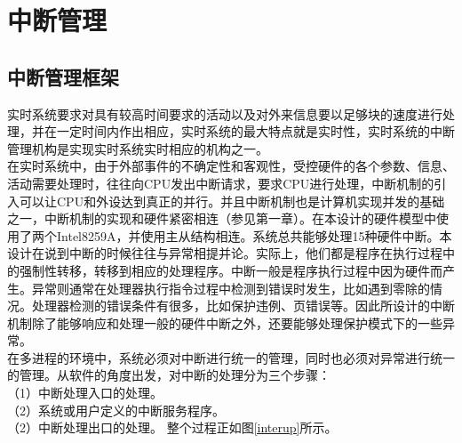 \documentclass[UTF8,nofonts,cs4size]{ctexrep}
\begin{document}
\section{中断管理}
\subsection{中断管理框架}
实时系统要求对具有较高时间要求的活动以及对外来信息要以足够块的速度进行处理，并在一定时间内作出相应，实时系统的最大特点就是实时性，实时系统的中断管理机构是实现实时系统实时相应的机构之一。
\\
\indent 在实时系统中，由于外部事件的不确定性和客观性，受控硬件的各个参数、信息、活动需要处理时，往往向CPU发出中断请求，要求CPU进行处理，中断机制的引入可以让CPU和外设达到真正的并行。并且中断机制也是计算机实现并发的基础之一，中断机制的实现和硬件紧密相连（参见第一章）。在本设计的硬件模型中使用了两个Intel8259A，并使用主从结构相连。系统总共能够处理15种硬件中断。本设计在说到中断的时候往往与异常相提并论。实际上，他们都是程序在执行过程中的强制性转移，转移到相应的处理程序。中断一般是程序执行过程中因为硬件而产生。异常则通常在处理器执行指令过程中检测到错误时发生，比如遇到零除的情况。处理器检测的错误条件有很多，比如保护违例、页错误等。因此所设计的中断机制除了能够响应和处理一般的硬件中断之外，还要能够处理保护模式下的一些异常。
\\
\indent  在多进程的环境中，系统必须对中断进行统一的管理，同时也必须对异常进行统一的管理。从软件的角度出发，对中断的处理分为三个步骤：
\\ \indent （1）中断处理入口的处理。
\\ \indent （2）系统或用户定义的中断服务程序。
\\ \indent （2）中断处理出口的处理。
整个过程正如图\ref{interup}所示。
\end{document}
